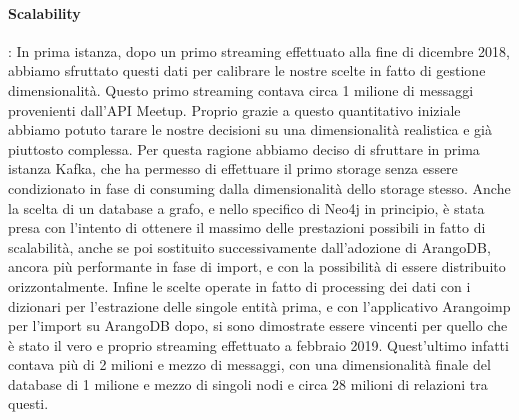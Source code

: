 \documentclass[fleqn,10pt]{SelfArx} %
\begin{document}
{{\paragraph{Scalability}: In prima istanza, dopo un primo streaming effettuato alla fine di dicembre 2018, abbiamo sfruttato questi dati per calibrare le nostre scelte in fatto di gestione dimensionalità. 
Questo primo streaming contava circa 1 milione di messaggi provenienti dall'API Meetup. 
Proprio grazie a questo quantitativo iniziale abbiamo potuto tarare le nostre decisioni su una dimensionalità realistica e già piuttosto complessa. 
Per questa ragione abbiamo deciso di sfruttare in prima istanza Kafka, che ha permesso di effettuare il primo storage senza essere condizionato in fase di consuming dalla dimensionalità dello storage stesso. 
Anche la scelta di un database a grafo, e nello specifico di Neo4j in principio, è stata presa con l'intento di ottenere il massimo delle prestazioni possibili in fatto di scalabilità, anche se poi sostituito successivamente dall'adozione di ArangoDB, ancora più performante in fase di import, e con la possibilità di essere distribuito orizzontalmente. 
Infine le scelte operate in fatto di processing dei dati con i dizionari per l'estrazione delle singole entità prima, e con l'applicativo Arangoimp per l'import su ArangoDB dopo, si sono dimostrate essere vincenti per quello che è stato il vero e proprio streaming effettuato a febbraio 2019.
Quest'ultimo infatti contava più di 2 milioni e mezzo di messaggi, con una dimensionalità finale del database di 1 milione e mezzo di singoli nodi e circa 28 milioni di relazioni tra questi.
}}
\end{document}
